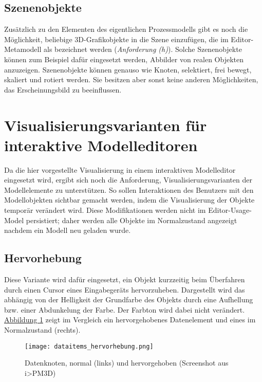 \documentclass[a4paper,10pt]{sphinxmanual}
\begin{document}
\subsection{Szenenobjekte}
\label{visualisierung:szenenobjekte}
Zusätzlich zu den Elementen des eigentlichen Prozessmodells gibt es noch die Möglichkeit, beliebige 3D-Grafikobjekte in die Szene einzufügen, die im Editor-Metamodell als  bezeichnet werden
(\emph{Anforderung (h)}).
Solche Szenenobjekte können zum Beispiel dafür eingesetzt werden, Abbilder von realen Objekten anzuzeigen.
Szenenobjekte können genauso wie Knoten, selektiert, frei bewegt, skaliert und rotiert werden. Sie besitzen aber sonst keine anderen Möglichkeiten, das Erscheinungsbild zu beeinflussen.


\section{Visualisierungsvarianten für interaktive Modelleditoren}
\label{visualisierung:visualisierungsvarianten}\label{visualisierung:visualisierungsvarianten-fur-interaktive-modelleditoren}
Da die hier vorgestellte Visualisierung in einem interaktiven Modelleditor eingesetzt wird, ergibt sich noch die Anforderung, Visualisierungsvarianten der Modellelemente zu unterstützen.
So sollen Interaktionen des Benutzers mit den Modellobjekten sichtbar gemacht werden, indem die Visualisierung der Objekte temporär verändert wird.
Diese Modifikationen werden nicht im Editor-Usage-Model persistiert; daher werden alle Objekte im Normalzustand angezeigt nachdem ein Modell neu geladen wurde.


\subsection{Hervorhebung}
\label{visualisierung:hervorhebung}\label{visualisierung:id3}
Diese Variante wird dafür eingesetzt, ein Objekt kurzzeitig beim Überfahren durch einen Cursor eines Eingabegeräts hervorzuheben.
Dargestellt wird das abhängig von der Helligkeit der Grundfarbe des Objekts durch eine Aufhellung bzw. einer Abdunkelung der Farbe. Der Farbton wird dabei nicht verändert.
\hyperref[visualisierung:hervorhebung-sc]{Abbildung  \ref*{visualisierung:hervorhebung-sc}} zeigt im Vergleich ein hervorgehobenes Datenelement und eines im Normalzustand (rechts).
\begin{figure}[htbp]
\centering
\capstart

\texttt{[image: dataitems\_hervorhebung.png]}
\caption{Datenknoten, normal (links) und hervorgehoben (Screenshot aus i\textgreater{}PM3D)}\label{visualisierung:hervorhebung-sc}\end{figure}
\end{document}

